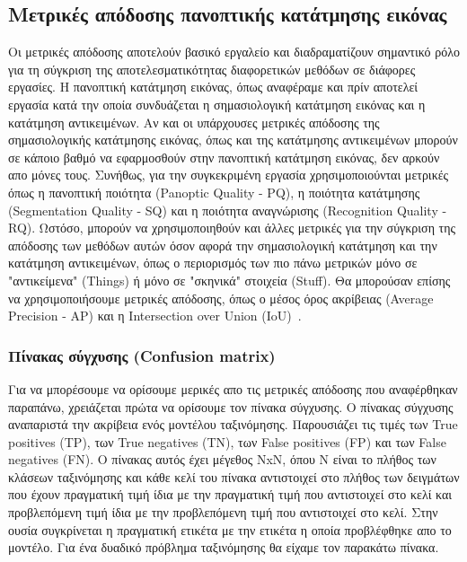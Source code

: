 \documentclass[12pt]{article}
\numberwithin{equation}{section}
\begin{document}
\subsection{Μετρικές απόδοσης πανοπτικής κατάτμησης εικόνας}

Οι μετρικές απόδοσης αποτελούν βασικό εργαλείο και διαδραματίζουν σημαντικό ρόλο για τη σύγκριση της αποτελεσματικότητας διαφορετικών μεθόδων σε διάφορες εργασίες. Η πανοπτική κατάτμηση εικόνας, όπως αναφέραμε και πρίν αποτελεί εργασία κατά την οποία συνδυάζεται η σημασιολογική κατάτμηση εικόνας και η κατάτμηση αντικειμένων. Αν και οι υπάρχουσες μετρικές απόδοσης της σημασιολογικής κατάτμησης εικόνας, όπως και της κατάτμησης αντικειμένων μπορούν σε κάποιο βαθμό να εφαρμοσθούν στην πανοπτική κατάτμηση εικόνας, δεν αρκούν απο μόνες τους. Συνήθως, για την συγκεκριμένη εργασία χρησιμοποιούνται μετρικές όπως η πανοπτική ποιότητα (Panoptic Quality - PQ), η ποιότητα κατάτμησης (Segmentation Quality - SQ) και η ποιότητα αναγνώρισης (Recognition Quality - RQ). Ωστόσο, μπορούν να χρησιμοποιηθούν και άλλες μετρικές για την σύγκριση της απόδοσης των μεθόδων αυτών όσον αφορά την σημασιολογική κατάτμηση και την κατάτμηση αντικειμένων, όπως ο περιορισμός των πιο πάνω μετρικών μόνο σε "αντικείμενα" (Things) ή μόνο σε "σκηνικά" στοιχεία (Stuff). Θα μπορούσαν επίσης να χρησιμοποιήσουμε μετρικές απόδοσης, όπως ο μέσος όρος ακρίβειας (Average Precision - AP) και η Intersection over Union (IoU)~\cite{elharrouss2021panopticsegmentationreview}. 

\subsubsection{Πίνακας σύγχυσης (Confusion matrix)}

Για να μπορέσουμε να ορίσουμε μερικές απο τις μετρικές απόδοσης που αναφέρθηκαν παραπάνω, χρειάζεται πρώτα να ορίσουμε τον πίνακα σύγχυσης. Ο πίνακας σύγχυσης αναπαριστά την ακρίβεια ενός μοντέλου ταξινόμησης. Παρουσιάζει τις τιμές των True positives (TP), των True negatives (TN), των False positives (FP) και των False negatives (FN). Ο πίνακας αυτός έχει μέγεθος NxN, όπου N είναι το πλήθος των κλάσεων ταξινόμησης και κάθε κελί του πίνακα αντιστοιχεί στο πλήθος των δειγμάτων που έχουν πραγματική τιμή ίδια με την πραγματική τιμή που αντιστοιχεί στο κελί και προβλεπόμενη τιμή ίδια με την προβλεπόμενη τιμή που αντιστοιχεί στο κελί. Στην ουσία συγκρίνεται η πραγματική ετικέτα με την ετικέτα η οποία προβλέφθηκε απο το μοντέλο. Για ένα δυαδικό πρόβλημα ταξινόμησης θα είχαμε τον παρακάτω πίνακα. 
\end{document}
